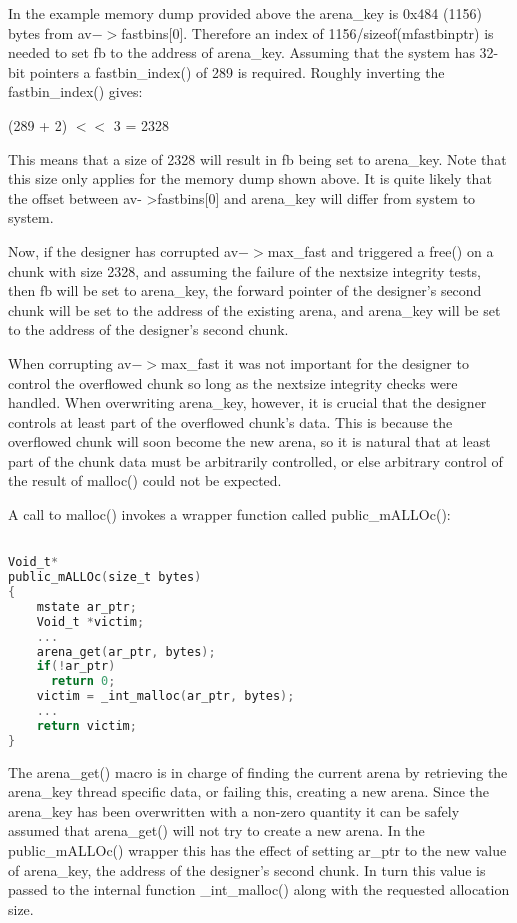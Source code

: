 \documentclass[12pt]{article}
\begin{document}
In the example memory dump provided above the arena\_key is 0x484
(1156) bytes from av$->$fastbins[0]. Therefore an index of
1156/sizeof(mfastbinptr) is needed to set fb to the address of
arena\_key. Assuming that the system has 32-bit pointers a
fastbin\_index() of 289 is required. Roughly inverting the
fastbin\_index() gives:

          (289 + 2) $<<$ 3 = 2328

This means that a size of 2328 will result in fb being set to
arena\_key. Note that this size only applies for the memory dump
shown above. It is quite likely that the offset between av-
>fastbins[0] and arena\_key will differ from system to system.
\newline


Now, if the designer has corrupted av$->$max\_fast and triggered a
free() on a chunk with size 2328, and assuming the failure of the
nextsize integrity tests, then fb will be set to arena\_key, the
forward pointer of the designer's second chunk will be set to the
address of the existing arena, and arena\_key will be set to the
address of the designer's second chunk.
\newline


When corrupting av$->$max\_fast it was not important for the designer
to control the overflowed chunk so long as the nextsize integrity
checks were handled. When overwriting arena\_key, however, it is
crucial that the designer controls at least part of the overflowed
chunk's data. This is because the overflowed chunk will soon become
the new arena, so it is natural that at least part of the chunk
data must be arbitrarily controlled, or else arbitrary control of
the result of malloc() could not be expected.
\newline


A call to malloc() invokes a wrapper function called
public\_mALLOc():
\begin{lstlisting}[language=C]

Void_t*
public_mALLOc(size_t bytes)
{
    mstate ar_ptr;
    Void_t *victim;
    ...
    arena_get(ar_ptr, bytes);
    if(!ar_ptr)
      return 0;
    victim = _int_malloc(ar_ptr, bytes);
    ...
    return victim;
}
\end{lstlisting}
The arena\_get() macro is in charge of finding the current arena by
retrieving the arena\_key thread specific data, or failing this,
creating a new arena. Since the arena\_key has been overwritten with
a non-zero quantity it can be safely assumed that arena\_get() will
not try to create a new arena. In the public\_mALLOc() wrapper this
has the effect of setting ar\_ptr to the new value of arena\_key, the
address of the designer's second chunk. In turn this value is
passed to the internal function \_int\_malloc() along with the
requested allocation size.
\newline
\end{document}
